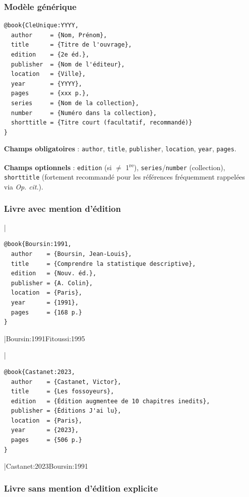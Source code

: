 \documentclass{article}
\begin{document}
\subsubsection{Modèle générique}

\begin{verbatim}
@book{CleUnique:YYYY,
  author     = {Nom, Prénom},
  title      = {Titre de l'ouvrage},
  edition    = {2e éd.},
  publisher  = {Nom de l'éditeur},
  location   = {Ville},
  year       = {YYYY},
  pages      = {xxx p.},
  series     = {Nom de la collection},
  number     = {Numéro dans la collection},
  shorttitle = {Titre court (facultatif, recommandé)}
}
\end{verbatim}

\textbf{Champs obligatoires} :
\texttt{author}, \texttt{title}, \texttt{publisher}, \texttt{location}, \texttt{year}, \texttt{pages}.

\textbf{Champs optionnels} :
\texttt{edition} (si $\neq$ 1\textsuperscript{re}),
\texttt{series}/\texttt{number} (collection),
\texttt{shorttitle} (fortement recommandé pour les références fréquemment rappelées via \emph{Op. cit.}).

\subsubsection{Livre avec mention d'édition}

|
\begin{verbatim}
@book{Boursin:1991,
  author    = {Boursin, Jean-Louis},
  title     = {Comprendre la statistique descriptive},
  edition   = {Nouv. éd.},
  publisher = {A. Colin},
  location  = {Paris},
  year      = {1991},
  pages     = {168 p.}
}
\end{verbatim}
|{Boursin:1991}{Fitoussi:1995}

|
\begin{verbatim}
@book{Castanet:2023,
  author    = {Castanet, Victor},
  title     = {Les fossoyeurs},
  edition   = {Édition augmentee de 10 chapitres inedits},
  publisher = {Éditions J'ai lu},
  location  = {Paris},
  year      = {2023},
  pages     = {506 p.}
}
\end{verbatim}
|{Castanet:2023}{Boursin:1991}

\subsubsection{Livre sans mention d'édition explicite}
\end{document}
